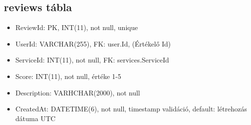 \documentclass[11pt]{article}
\begin{document}
\subsection{reviews tábla}
\label{sec:orgab51bb5}
\begin{itemize}
\item ReviewId: PK, INT(11), not null, unique
\item UserId: VARCHAR(255), FK: user.Id, (Értékelő Id)
\item ServiceId: INT(11), not null, FK: services.ServiceId
\item Score: INT(11), not null, értéke 1-5
\item Description: VARHCHAR(2000), not null
\item CreatedAt: DATETIME(6), not null, timestamp validáció, default: létrehozás dátuma UTC
\end{itemize}
\end{document}
